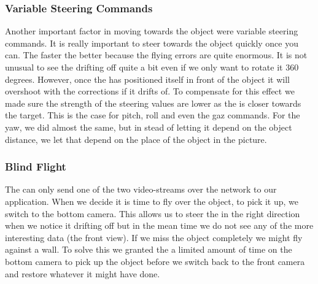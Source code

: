 \subsubsection{Variable Steering Commands}
Another important factor in moving towards the object were variable steering commands. 
It is really important to steer towards the object quickly once you can. The faster the 
better because the flying errors are quite enormous. It is not unusual to see the \Ardrone
drifting off quite a bit even if we only want to rotate it 360 degrees. However, once
the \Ardrone has positioned itself in front of the object it will overshoot with the
corrections if it drifts of. To compensate for this effect we made sure the strength
of the steering values are lower as the \Ardrone is closer towards the target. This
is the case for pitch, roll and even the gaz commands. For the yaw, we did
almost the same, but in stead of letting it depend on the object distance, we
let that depend on the place of the object in the picture. 

\subsubsection{Blind Flight}
The \Ardrone can only send one of the two video-streams over the network to our application. 
When we decide it is time to fly over the object, to pick it up, we switch to the bottom 
camera. This allows us to steer the \Ardrone in the right direction when we notice it drifting
off but in the mean time we do not see any of the more interesting data (the front view). If
we miss the object completely we might fly against a wall. To solve this we granted the
\Ardrone a limited amount of time on the bottom camera to pick up the object before we switch
back to the front camera and restore whatever it might have done. 

\label{sec:pickingUp}

























